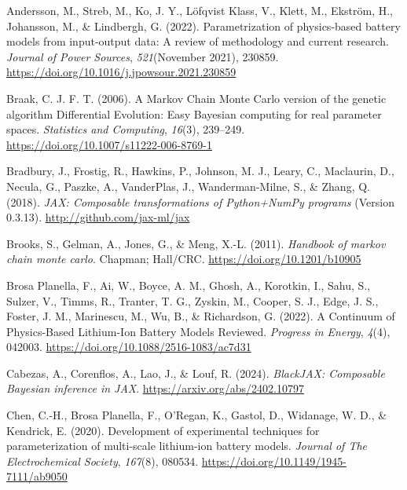 \documentclass[
]{article}
\newlength{\cslhangindent}
\newenvironment{CSLReferences}[2] %
 {\begin{list}{}{%
  \setlength{\itemindent}{0pt}
  \setlength{\leftmargin}{0pt}
  \setlength{\parsep}{0pt}
  \ifodd #1
   \setlength{\leftmargin}{\cslhangindent}
   \setlength{\itemindent}{-1\cslhangindent}
  \fi
  \setlength{\itemsep}{#2\baselineskip}}}
 {\end{list}}
\begin{document}
\label{refs}
\begin{CSLReferences}{1}{0}
Andersson, M., Streb, M., Ko, J. Y., Löfqvist Klass, V., Klett, M.,
Ekström, H., Johansson, M., \& Lindbergh, G. (2022). Parametrization of
physics-based battery models from input-output data: {A} review of
methodology and current research. \emph{Journal of Power Sources},
\emph{521}(November 2021), 230859.
\url{https://doi.org/10.1016/j.jpowsour.2021.230859}

Braak, C. J. F. T. (2006). A {Markov} {Chain} {Monte} {Carlo} version of
the genetic algorithm {Differential} {Evolution}: Easy {Bayesian}
computing for real parameter spaces. \emph{Statistics and Computing},
\emph{16}(3), 239--249. \url{https://doi.org/10.1007/s11222-006-8769-1}

Bradbury, J., Frostig, R., Hawkins, P., Johnson, M. J., Leary, C.,
Maclaurin, D., Necula, G., Paszke, A., VanderPlas, J., Wanderman-Milne,
S., \& Zhang, Q. (2018). \emph{{JAX}: Composable transformations of
{P}ython+{N}um{P}y programs} (Version 0.3.13).
\url{http://github.com/jax-ml/jax}

Brooks, S., Gelman, A., Jones, G., \& Meng, X.-L. (2011). \emph{Handbook
of markov chain monte carlo}. Chapman; Hall/CRC.
\url{https://doi.org/10.1201/b10905}

Brosa Planella, F., Ai, W., Boyce, A. M., Ghosh, A., Korotkin, I., Sahu,
S., Sulzer, V., Timms, R., Tranter, T. G., Zyskin, M., Cooper, S. J.,
Edge, J. S., Foster, J. M., Marinescu, M., Wu, B., \& Richardson, G.
(2022). {A Continuum of Physics-Based Lithium-Ion Battery Models
Reviewed}. \emph{Progress in Energy}, \emph{4}(4), 042003.
\url{https://doi.org/10.1088/2516-1083/ac7d31}

Cabezas, A., Corenflos, A., Lao, J., \& Louf, R. (2024). \emph{BlackJAX:
Composable {B}ayesian inference in {JAX}}.
\url{https://arxiv.org/abs/2402.10797}

Chen, C.-H., Brosa Planella, F., O'Regan, K., Gastol, D., Widanage, W.
D., \& Kendrick, E. (2020). Development of experimental techniques for
parameterization of multi-scale lithium-ion battery models.
\emph{Journal of The Electrochemical Society}, \emph{167}(8), 080534.
\url{https://doi.org/10.1149/1945-7111/ab9050}


\end{CSLReferences}
\end{document}
